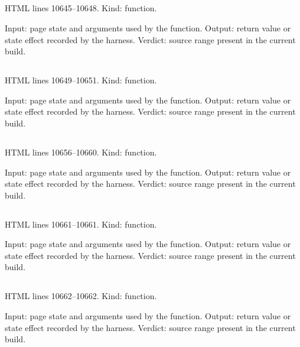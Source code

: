 \subsection*{\texttt{}}
\label{vf_573_rdmlEntries}
HTML lines 10645--10648. Kind: function.

Input: page state and arguments used by the function.
Output: return value or state effect recorded by the harness.
Verdict: source range present in the current build.

\subsection*{\texttt{}}
\label{vf_574_rdmlIsContainer}
HTML lines 10649--10651. Kind: function.

Input: page state and arguments used by the function.
Output: return value or state effect recorded by the harness.
Verdict: source range present in the current build.

\subsection*{\texttt{}}
\label{vf_575_rdmlKids}
HTML lines 10656--10660. Kind: function.

Input: page state and arguments used by the function.
Output: return value or state effect recorded by the harness.
Verdict: source range present in the current build.

\subsection*{\texttt{}}
\label{vf_576_rdmlKid}
HTML lines 10661--10661. Kind: function.

Input: page state and arguments used by the function.
Output: return value or state effect recorded by the harness.
Verdict: source range present in the current build.

\subsection*{\texttt{}}
\label{vf_577_rdmlText}
HTML lines 10662--10662. Kind: function.

Input: page state and arguments used by the function.
Output: return value or state effect recorded by the harness.
Verdict: source range present in the current build.

